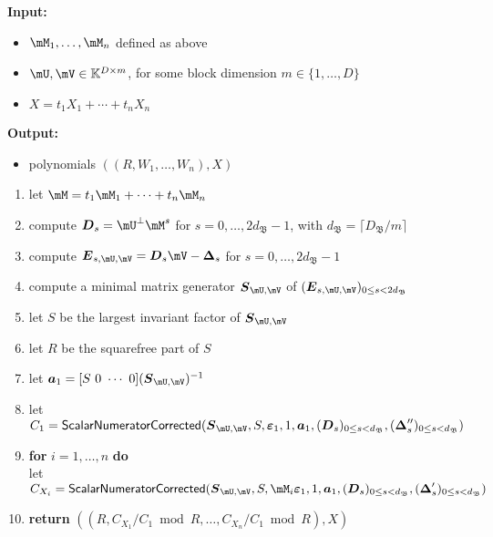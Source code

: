 \documentclass[12pt]{article}
\newcommand{\mat}[1]{\bm{\MakeUppercase{#1}}} %
\newcommand{\row}[1]{\bm{\MakeLowercase{#1}}} %
\newcommand{\col}[1]{\bm{\MakeLowercase{#1}}} %
\newcommand{\mainalgoname}{\mathsf{ BlockParametrization}}
\newcommand{\lf}{X}
\begin{document}
\begin{algorithm}[H]
	\caption{$\mainalgoname{\sf Residual}(\mM_1,\dots,\mM_n,\mU,\mV,(\mat{\Delta}_s),(\mat{\Delta}'_s),(\mat{\Delta}''_s),\lf)$}
	{\bf Input:} \vspace{-0.5em}
	\begin{itemize}
	\item $\mM_1,\dots,\mM_n$ defined as above
	\item  $\mU,\mV \in \mathbb{K}^{D \times m}$, for some block dimension  $m \in \{1,\dots,D\}$
        \item $\lf =t_1 X_1 + \cdots + t_n X_n$
	\end{itemize}
	    {\bf Output:}  \vspace{-0.5em}
        \begin{itemize}
        \item  polynomials $((R,W_1,\dots,W_n),\lf)$
        \end{itemize}
  \begin{enumerate}
  \item\label{residualstep1}   let $\mM = t_1 \mM_1 + \cdots + t_n \mM_n$
  \item\label{residualstep3} { compute $\mat{D}_s = \mU^{\perp}\mM^s$ for $s=0,\dots,2d_\mathfrak{B}-1$, with $d_\mathfrak{B} = \lceil D_\mathfrak{B}/m \rceil$}
  \item\label{residualstep4} { compute $\mat{E}_{s,\mU,\mV}= \mat{D}_s\mV-\mat{\Delta}_s$ for $s=0,\dots, 2d_\mathfrak{B}-1$}
  \item\label{residualstep5} { compute a minimal matrix generator $\mat{S}_{\mU,\mV}$ of $(\mat{E}_{s,\mU,\mV})_{0 \le s < 2d_\mathfrak{B}}$}
  \item\label{residualstep6} { let $S$ be the largest invariant factor of $\mat{S}_{\mU,\mV}$}
  \item\label{residualstep7} { let $R$ be  the squarefree part  of $S$}
  \item\label{residualstep8} { let $\row{a}_1 = [S~0 ~\cdots~ 0] (\mat{S}_{\mU,\mV})^{-1}$}
  \item\label{residualstep9}  let $C_1 = \mathsf{{\sf ScalarNumeratorCorrected}}(\mat{S}_{\mU,\mV}, S, \col{\varepsilon}_1, 1, \row{a}_1,  (\mat{D}_s)_{0 \le s < d_\mathfrak{B}}, (\mat{\Delta}''_s)_{0 \le s < d_\mathfrak{B}})$
  \item\label{residualstep10} \textbf{for} $i=1,\dots,n$ \textbf{do} \\
    \phantom{for}let $C_{X_i} = \mathsf{{\sf ScalarNumeratorCorrected}}(\mat{S}_{\mU,\mV},S, \mM_i\col{\varepsilon}_1, 1, \row{a}_1, (\mat{D}_s)_{0 \le s < d_\mathfrak{B}}, (\mat{\Delta}'_s)_{0 \le s < d_\mathfrak{B}})$
\item\label{residualstep11}     \textbf{return} $((R, C_{X_1}/ C_1 \bmod R, \dots, C_{X_n}/ C_{1} \bmod R),\lf)$
  \end{enumerate}  \label{algo:block-sparse-fglm-residual}
\end{algorithm}
\end{document}
